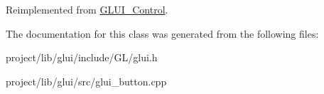 Reimplemented from \hyperlink{classGLUI__Control}{G\-L\-U\-I\-\_\-\-Control}.



The documentation for this class was generated from the following files\-:\begin{DoxyCompactItemize}
\item 
project/lib/glui/include/\-G\-L/glui.\-h\item 
project/lib/glui/src/glui\-\_\-button.\-cpp\end{DoxyCompactItemize}
